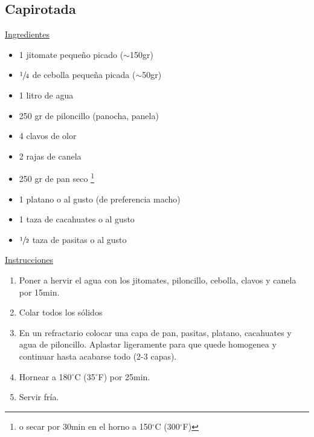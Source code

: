 \subsection{Capirotada}
\underline{Ingredientes}
\begin{itemize}
\item 1 jitomate pequeño picado ($\sim$150gr)
\item $\sfrac{1}{4}$ de cebolla pequeña picada ($\sim$50gr)
\item 1 litro de agua
\item 250 gr de piloncillo (panocha, panela)
\item 4 clavos de olor
\item 2 rajas de canela
\item 250 gr de pan seco \footnote{o secar por 30min en el horno a 150$^\circ $C (300$^\circ $F)}
\item 1 platano o al gusto (de preferencia macho)
\item 1 taza de cacahuates o al gusto
\item $\sfrac{1}{2}$ taza de pasitas o al gusto
\end{itemize}

\underline{Instrucciones}

\begin{enumerate}
\item Poner a hervir el agua con los jitomates, piloncillo, cebolla, clavos y canela por 15min.
\item Colar todos los s\'olidos
\item En un refractario colocar una capa de pan, pasitas, platano, cacahuates y agua de piloncillo. Aplastar ligeramente para que quede homogenea y continuar hasta acabarse todo (2-3 capas).
\item Hornear a 180$^\circ $C (35$^\circ $F) por 25min.
\item Servir fr\'ia.
\end{enumerate}
